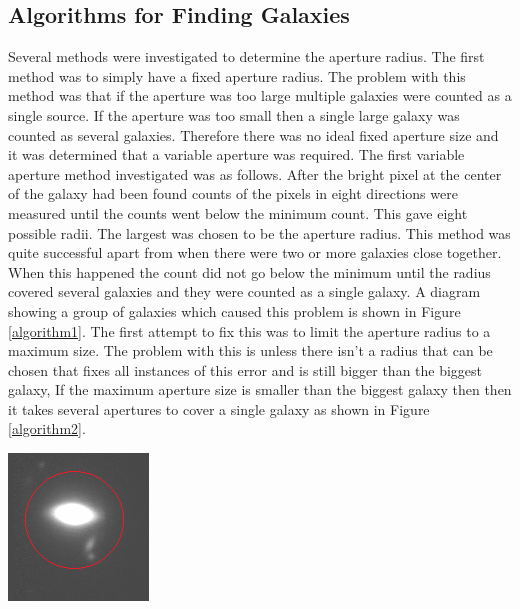 \documentclass[10pt,a4paper]{article}
\begin{document}
\subsection*{Algorithms for Finding Galaxies}
Several methods were investigated to determine the aperture radius. The first method was to simply have a fixed aperture radius. The problem with this method was that if the aperture was too large multiple galaxies were counted as a single source. If the aperture was too small then a single large galaxy was counted as several galaxies. Therefore there was no ideal fixed aperture size and it was determined that a variable aperture was required. The first variable aperture method investigated was as follows. After the bright pixel at the center of the galaxy had been found counts of the pixels in eight directions were measured until the counts went below the minimum count. This gave eight possible radii. The largest was chosen to be the aperture radius. This method was quite successful apart from when there were two or more galaxies close together. When this happened the count did not go below the minimum until the radius covered several galaxies and they were counted as a single galaxy. A diagram showing a group of galaxies which caused this problem is shown in Figure \ref{algorithm1}. The first attempt to fix this was to limit the aperture radius to a maximum size. The problem with this is unless there isn't a radius that can be chosen that fixes all instances of this error and is still bigger than the biggest galaxy, If the maximum aperture size is smaller than the biggest galaxy then then it takes several apertures to cover a single galaxy as shown in Figure \ref{algorithm2}.

\begin{center}
\includegraphics [width=10 cm]{algorithm1.png}
\label{algorithm1}
\end{center}
\end{document}
